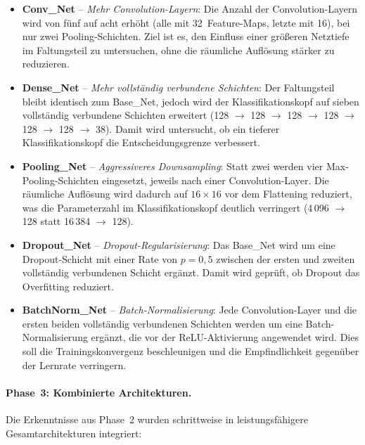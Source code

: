 \begin{itemize}
    \item \textbf{Conv\_Net} -- \textit{Mehr Convolution-Layern}: Die Anzahl der Convolution-Layern wird von fünf auf acht erhöht (alle mit 32~Feature-Maps, letzte mit 16), bei nur zwei Pooling-Schichten. Ziel ist es, den Einfluss einer größeren Netztiefe im Faltungsteil zu untersuchen, ohne die räumliche Auflösung stärker zu reduzieren.
 
    \item \textbf{Dense\_Net} -- \textit{Mehr vollständig verbundene Schichten}: Der Faltungsteil bleibt identisch zum Base\_Net, jedoch wird der Klassifikationskopf auf sieben vollständig verbundene Schichten erweitert (128 $\rightarrow$ 128 $\rightarrow$ 128 $\rightarrow$ 128 $\rightarrow$ 128 $\rightarrow$ 128 $\rightarrow$ 38). Damit wird untersucht, ob ein tieferer Klassifikationskopf die Entscheidungsgrenze verbessert.
 
    \item \textbf{Pooling\_Net} -- \textit{Aggressiveres Downsampling}: Statt zwei werden vier Max-Pooling-Schichten eingesetzt, jeweils nach einer Convolution-Layer. Die räumliche Auflösung wird dadurch auf $16 \times 16$ vor dem Flattening reduziert, was die Parameterzahl im Klassifikationskopf deutlich verringert (4\,096 $\rightarrow$ 128 statt 16\,384 $\rightarrow$ 128).
 
    \item \textbf{Dropout\_Net} -- \textit{Dropout-Regularisierung}: Das Base\_Net wird um eine Dropout-Schicht mit einer Rate von $p = 0{,}5$ zwischen der ersten und zweiten vollständig verbundenen Schicht ergänzt. Damit wird geprüft, ob Dropout das Overfitting reduziert.
 
    \item \textbf{BatchNorm\_Net} -- \textit{Batch-Normalisierung}: Jede Convolution-Layer und die ersten beiden vollständig verbundenen Schichten werden um eine Batch-Normalisierung ergänzt, die vor der ReLU-Aktivierung angewendet wird. Dies soll die Trainingskonvergenz beschleunigen und die Empfindlichkeit gegenüber der Lernrate verringern.
\end{itemize}
 
\paragraph{Phase~3: Kombinierte Architekturen.}
Die Erkenntnisse aus Phase~2 wurden schrittweise in leistungsfähigere Gesamtarchitekturen integriert:
 
